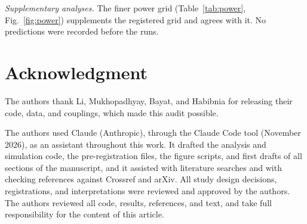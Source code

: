 \documentclass{ieeeaccess}
\begin{document}
\emph{Supplementary analyses.} The finer power grid (Table~\ref{tab:power}, Fig.~\ref{fig:power}) supplements the registered grid and agrees with it. No predictions were recorded before the runs.

\section*{Acknowledgment}
The authors thank Li, Mukhopadhyay, Bayat, and Habibnia for releasing their code, data, and couplings, which made this audit possible.

The authors used Claude (Anthropic), through the Claude Code tool (November 2026), as an assistant throughout this work. It drafted the analysis and simulation code, the pre-registration files, the figure scripts, and first drafts of all sections of the manuscript, and it assisted with literature searches and with checking references against Crossref and arXiv. All study design decisions, registrations, and interpretations were reviewed and approved by the authors. The authors reviewed all code, results, references, and text, and take full responsibility for the content of this article.
\end{document}
